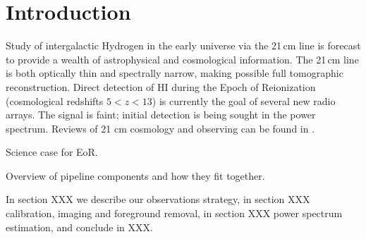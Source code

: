 \section{Introduction} 
  Study of intergalactic Hydrogen  in the early universe via the 21\,cm line is forecast to provide a wealth of astrophysical and cosmological information.  The 21\,cm line is both optically thin and spectrally narrow, making possible full tomographic reconstruction.  Direct detection of HI during the Epoch of Reionization (cosmological redshifts $5<z<13$) is currently the goal of several new radio arrays. The signal is faint; initial detection is being sought in the power spectrum. Reviews of 21 cm cosmology and observing can be found in \cite{Morales:2010p8093,Furlanetto:2006p2267,Pritchard:2012p9555,zaroubi2013epoch}.
  




Science case for EoR.

Overview of pipeline components and how they fit together.

In section XXX we describe our observations strategy, in section XXX calibration, imaging and foreground removal, in section XXX power spectrum estimation, and conclude in XXX.